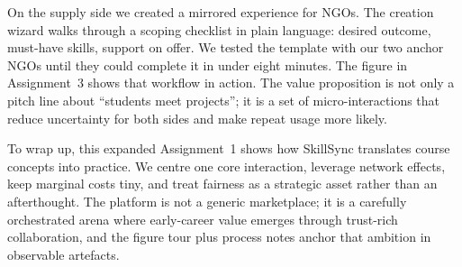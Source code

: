On the supply side we created a mirrored experience for NGOs. The creation wizard walks through a scoping checklist in plain language: desired outcome, must-have skills, support on offer. We tested the template with our two anchor NGOs until they could complete it in under eight minutes. The figure in Assignment~3 shows that workflow in action. The value proposition is not only a pitch line about ``students meet projects''; it is a set of micro-interactions that reduce uncertainty for both sides and make repeat usage more likely.

To wrap up, this expanded Assignment~1 shows how SkillSync translates course concepts into practice. We centre one core interaction, leverage network effects, keep marginal costs tiny, and treat fairness as a strategic asset rather than an afterthought. The platform is not a generic marketplace; it is a carefully orchestrated arena where early-career value emerges through trust-rich collaboration, and the figure tour plus process notes anchor that ambition in observable artefacts.
